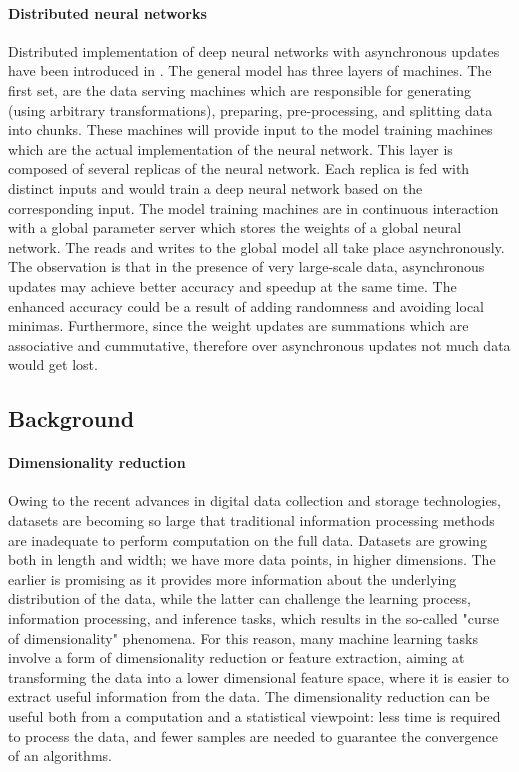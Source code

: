 \documentclass{article}
\begin{document}
\paragraph{Distributed neural networks} Distributed implementation of deep neural networks with asynchronous updates have been introduced in  \cite{dean2012large, chilimbi2014project}. The general model has three layers of machines. The first set, are the data serving machines which are responsible for generating (using arbitrary transformations), preparing, pre-processing, and splitting data into chunks. These machines will provide input to the model training machines which are the actual implementation of the neural network. This layer is composed of several replicas of the neural network. Each replica is fed with distinct inputs and would train a deep neural network based on the corresponding input. The model training machines are in continuous  interaction with a global parameter server which stores the weights of a global neural network. The reads and writes to the global model all take place asynchronously. The observation is that in the presence of very large-scale data, asynchronous updates may achieve better accuracy and speedup at the same time. The enhanced accuracy could be a result of adding randomness and avoiding local minimas. Furthermore, since the weight updates are summations which are associative and cummutative, therefore over asynchronous updates not much data would get lost.

\subsection{Background}
\paragraph{Dimensionality reduction}

Owing to the recent advances in digital data collection and storage technologies, datasets are becoming so large that traditional information processing methods are inadequate to perform computation on the full data. Datasets are growing both in length and width; we have more data points, in higher dimensions. The earlier is promising as it provides more information about the underlying distribution of the data, while the latter can challenge the learning process, information processing, and inference tasks, which results in the so-called "curse of dimensionality" phenomena. For this reason, many machine learning tasks involve a form of dimensionality reduction or feature extraction, aiming at transforming the data into a lower dimensional feature space, where it is easier to extract useful information from the data. The dimensionality reduction can be useful both from a computation and a statistical viewpoint: less time is required to process the data, and fewer samples are needed to guarantee the convergence of an algorithms.\\
\end{document}

